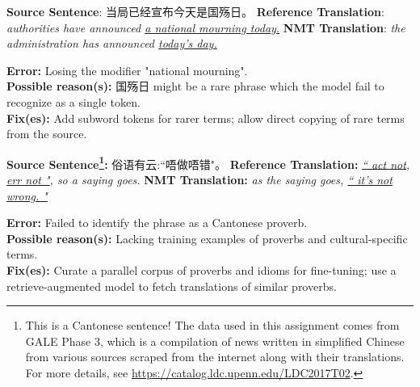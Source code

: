 \begin{parts}
\begin{subparts}
        \subpart[2]
        \textbf{Source Sentence}: 当局已经宣布今天是国殇日。 \newline
        \textbf{Reference Translation}: \textit{authorities have announced \underline{a national mourning today.}}\newline
        \textbf{NMT Translation}: \textit{the administration has announced \underline{today's day.}}
        
        \ifans{} \textbf{Error:} Losing the modifier "national mourning".\\
        \textbf{Possible reason(s):} 国殇日 might be a rare phrase which the model fail to recognize as a single token.\\
        \textbf{Fix(es):} Add subword tokens for rarer terms; allow direct copying of rare terms from the source.
        
        \subpart[2] 
        \textbf{Source Sentence\footnote{This is a Cantonese sentence! The data used in this assignment comes from GALE Phase 3, which is a compilation of news written in simplified Chinese from various sources scraped from the internet along with their translations. For more details, see \url{https://catalog.ldc.upenn.edu/LDC2017T02}. }:} 俗语有云:``唔做唔错"。\newline
        \textbf{Reference Translation:} \textit{\underline{`` act not, err not "}, so a saying goes.}\newline
        \textbf{NMT Translation:} \textit{as the saying goes, \underline{`` it's not wrong. "}}
        
        \ifans{} \textbf{Error:} Failed to identify the phrase as a Cantonese proverb.\\
        \textbf{Possible reason(s):} Lacking training examples of proverbs and cultural-specific terms.\\
        \textbf{Fix(es):} Curate a parallel corpus of proverbs and idioms for fine-tuning; use a retrieve-augmented model to fetch translations of similar proverbs.

    \end{subparts}



\end{parts}
